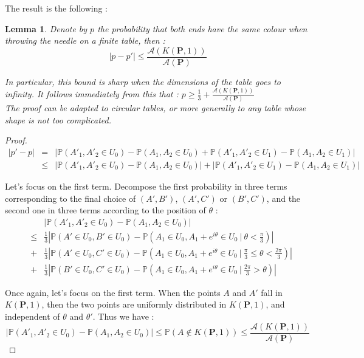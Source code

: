 \documentclass[a4paper,11pt]{article}
\newtheorem{lemma}{Lemma}
\theoremstyle{definition}
\theoremstyle{remark}
\begin{document}
The result is the following :
\begin{lemma}
Denote by $p$ the probability that both ends have the same colour when throwing 
the needle on a finite table, then :
 $$ | p - p'| \leq \frac{\mathcal{A}(K(\mathbf{P},1))}{\mathcal{A}(\mathbf{P})} $$

In particular, this bound is sharp when the dimensions of the table goes to 
infinity. It follows immediately from this that : $p \geq \frac13 + \frac{\mathcal{A}(K(\mathbf{P},1))}{\mathcal{A}(\mathbf{P})} $ \\
The proof can be adapted to circular tables, or more generally to any table 
whose shape is not too complicated. \\
\end{lemma}

\begin{proof}

\begin{eqnarray*}
|p' - p| 
  &=& | \mathbb{P}(A'_1 , A'_2 \in U_0) - \mathbb{P}(A_1 , A_2 \in U_0) + \mathbb{P}(A'_1 , A'_2 \in U_1) - \mathbb{P}(A_1 , A_2 \in U_1) | \\
  &\leq& | \mathbb{P}(A'_1 , A'_2 \in U_0) - \mathbb{P}(A_1 , A_2 \in U_0) | + | \mathbb{P}(A'_1 , A'_2 \in U_1) - \mathbb{P}(A_1 , A_2 \in U_1) | 
\end{eqnarray*}

Let's focus on the first term. 
Decompose the first probability in three terms corresponding to the final 
choice of $(A',B')$, $(A',C')$ or $(B',C')$, and the second one in three terms 
according to the position of $\theta$ :
\begin{eqnarray*}
& & \left| \mathbb{P}(A'_1 , A'_2 \in U_0) - \mathbb{P}(A_1 , A_2 \in U_0) \right| \\
&\leq& \frac{1}{3} \left| \mathbb{P}(A' \in U_0 , B' \in U_0) - \mathbb{P}(A_1 \in U_0 , A_1 + e^{i \theta} \in U_0 \ |\  \theta < \frac{\pi}{3} ) \right| \\
&+& \frac{1}{3} \left| \mathbb{P}(A' \in U_0 , C' \in U_0) - \mathbb{P}(A_1 \in U_0 , A_1 + e^{i \theta} \in U_0 \ |\  \frac{\pi}{3} \leq \theta < \frac{2 \pi}{3} ) \right| \\
&+& \frac{1}{3} \left| \mathbb{P}(B' \in U_0 ,C' \in U_0) - \mathbb{P}(A_1 \in U_0 , A_1 + e^{i \theta} \in U_0 \ | \  \frac{2 \pi}{3} > \theta ) \right|
\end{eqnarray*}

Once again, let's focus on the first term. When the points $A$ and 
$A'$ fall in $K(\mathbf{P},1)$, then the two points are uniformly distributed in 
$K(\mathbf{P},1)$, and independent of $\theta$ and $\theta'$. Thus we have : 
$$ \left| \mathbb{P}(A'_1 , A'_2 \in U_0) - \mathbb{P}(A_1 , A_2 \in U_0) \right| \leq \mathbb P(A \not \in K(\mathbf{P},1)) \leq \frac{\mathcal{A}(K(\mathbf{P},1))}{\mathcal{A}(\mathbf{P})} $$


\end{proof}
\end{document}
